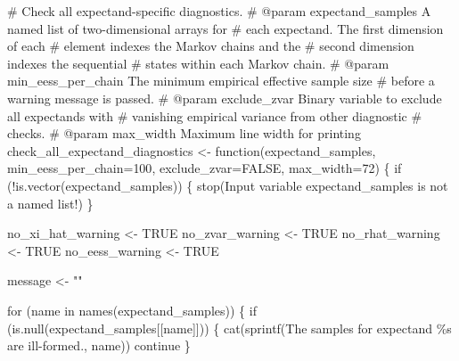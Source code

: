 \documentclass[
  letterpaper,
  DIV=11,
  numbers=noendperiod]{scrartcl}
\newenvironment{Shaded}{\begin{snugshade}}{\end{snugshade}}
\newcommand{\CommentTok}[1]{\textcolor[rgb]{0.37,0.37,0.37}{#1}}
\newcommand{\ControlFlowTok}[1]{\textcolor[rgb]{0.00,0.23,0.31}{#1}}
\newcommand{\DecValTok}[1]{\textcolor[rgb]{0.68,0.00,0.00}{#1}}
\newcommand{\KeywordTok}[1]{\textcolor[rgb]{0.00,0.23,0.31}{#1}}
\newcommand{\NormalTok}[1]{\textcolor[rgb]{0.00,0.23,0.31}{#1}}
\newcommand{\OperatorTok}[1]{\textcolor[rgb]{0.37,0.37,0.37}{#1}}
\newcommand{\SpecialCharTok}[1]{\textcolor[rgb]{0.37,0.37,0.37}{#1}}
\newcommand{\StringTok}[1]{\textcolor[rgb]{0.13,0.47,0.30}{#1}}
\begin{document}
\begin{Shaded}
\begin{Highlighting}[]
\CommentTok{\# Check all expectand{-}specific diagnostics.}
\CommentTok{\# @param expectand\_samples A named list of two{-}dimensional arrays for }
\CommentTok{\#                          each expectand.  The first dimension of each}
\CommentTok{\#                          element indexes the Markov chains and the }
\CommentTok{\#                          second dimension indexes the sequential }
\CommentTok{\#                          states within each Markov chain.}
\CommentTok{\# @param min\_eess\_per\_chain The minimum empirical effective sample size}
\CommentTok{\#                           before a warning message is passed.}
\CommentTok{\# @param exclude\_zvar Binary variable to exclude all expectands with}
\CommentTok{\#                     vanishing empirical variance from other diagnostic}
\CommentTok{\#                     checks.}
\CommentTok{\# @param max\_width Maximum line width for printing}
\NormalTok{check\_all\_expectand\_diagnostics }\OperatorTok{\textless{}{-}}\NormalTok{ function(expectand\_samples,}
\NormalTok{                                            min\_eess\_per\_chain}\OperatorTok{=}\DecValTok{100}\NormalTok{,}
\NormalTok{                                            exclude\_zvar}\OperatorTok{=}\NormalTok{FALSE,}
\NormalTok{                                            max\_width}\OperatorTok{=}\DecValTok{72}\NormalTok{) \{}
  \ControlFlowTok{if}\NormalTok{ (}\OperatorTok{!}\KeywordTok{is}\NormalTok{.vector(expectand\_samples)) \{}
\NormalTok{    stop(}\StringTok{\textquotesingle{}Input variable \textasciigrave{}expectand\_samples\textasciigrave{} is not a named list!\textquotesingle{}}\NormalTok{)}
\NormalTok{  \}}
  
\NormalTok{  no\_xi\_hat\_warning }\OperatorTok{\textless{}{-}}\NormalTok{ TRUE}
\NormalTok{  no\_zvar\_warning }\OperatorTok{\textless{}{-}}\NormalTok{ TRUE}
\NormalTok{  no\_rhat\_warning }\OperatorTok{\textless{}{-}}\NormalTok{ TRUE}
\NormalTok{  no\_eess\_warning }\OperatorTok{\textless{}{-}}\NormalTok{ TRUE}

\NormalTok{  message }\OperatorTok{\textless{}{-}} \StringTok{""}

  \ControlFlowTok{for}\NormalTok{ (name }\KeywordTok{in}\NormalTok{ names(expectand\_samples)) \{}
    \ControlFlowTok{if}\NormalTok{ (}\KeywordTok{is}\NormalTok{.null(expectand\_samples[[name]])) \{}
\NormalTok{      cat(sprintf(}\StringTok{\textquotesingle{}The samples for expectand \textasciigrave{}}\SpecialCharTok{\%s}\StringTok{\textasciigrave{} are ill{-}formed.\textquotesingle{}}\NormalTok{, name))}
      \ControlFlowTok{continue}
\NormalTok{    \}}
    

\end{Highlighting}
\end{Shaded}
\end{document}
